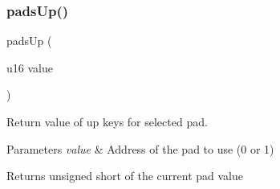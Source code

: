 \subsubsection{\texorpdfstring{pads\+Up()}{padsUp()}}
{\footnotesize\ttfamily pads\+Up (\begin{DoxyParamCaption}\item[{u16}]{value }\end{DoxyParamCaption})}



Return value of up keys for selected pad. 


\begin{DoxyParams}{Parameters}
{\em value} & Address of the pad to use (0 or 1) \\
\hline
\end{DoxyParams}
\begin{DoxyReturn}{Returns}
unsigned short of the current pad value 
\end{DoxyReturn}
